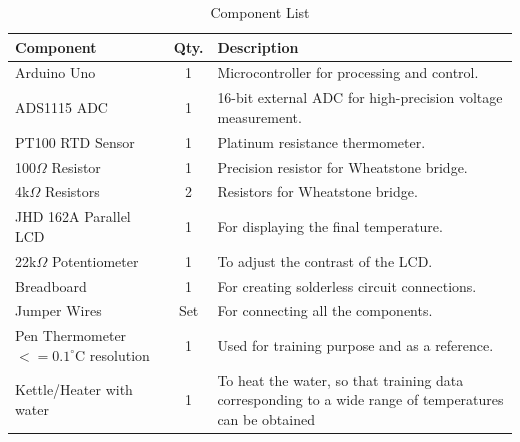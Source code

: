 \begin{table}[H]
\centering
\begin{tabular}{|l|c|p{4cm}|}
    \hline
    \textbf{Component} & \textbf{Qty.} & \textbf{Description} \\
    \hline
    Arduino Uno & 1 & Microcontroller for processing and control. \\
    \hline
    ADS1115 ADC & 1 & 16-bit external ADC for high-precision voltage measurement. \\
    \hline
    PT100 RTD Sensor & 1 & Platinum resistance thermometer. \\
    \hline
    100$\Omega$ Resistor & 1 & Precision resistor for Wheatstone bridge. \\
    \hline
    4k$\Omega$ Resistors & 2 & Resistors for Wheatstone bridge. \\
    \hline
    JHD 162A Parallel LCD & 1 & For displaying the final temperature. \\
    \hline
    22k$\Omega$ Potentiometer & 1 & To adjust the contrast of the LCD. \\
    \hline
    Breadboard & 1 & For creating solderless circuit connections. \\
    \hline
    Jumper Wires & Set & For connecting all the components. \\
    \hline
    \makecell{Pen Thermometer \\ $<=0.1^\circ$C resolution} & 1 & Used for training purpose and as a reference. \\
    \hline
    Kettle/Heater with water & 1 & To heat the water, so that training data corresponding to a wide range of temperatures can be obtained\\
    \hline
\end{tabular}
\caption{Component List}
\label{table:list_table}
\end{table}
